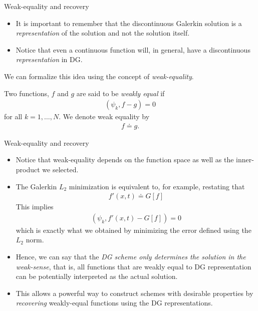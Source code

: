 \documentclass[aspectratio=169]{beamer}
\newcommand{\mypause}{}
\newcommand{\cramplist}{
	\setlength{\itemsep}{0in}
	\setlength{\partopsep}{0in}
	\setlength{\topsep}{0in}}
\begin{document}
\begin{frame}{Weak-equality and recovery}
  \footnotesize
  \begin{itemize}\cramplist
  \item It is important to remember that the discontinuous Galerkin
    solution is a \emph{representation} of the solution and not the
    solution itself.
  \item Notice that even a continuous function will, in general, have
    a discontinuous \emph{representation} in DG.
  \end{itemize}
  \mypause%
  We can formalize this idea using the concept of
  \emph{weak-equality}.

  \begin{definition}
    Two functions, $f$ and $g$ are said to be \emph{weakly equal} if
    \begin{align*}
      (\psi_k,f-g) = 0
    \end{align*}
    for all $k=1,\ldots,N$. We denote weak equality by
    \begin{align*}
      f \doteq g.
    \end{align*}
  \end{definition}  
  
\end{frame}


\begin{frame}{Weak-equality and recovery}
  \footnotesize
  \begin{itemize}
  \item Notice that weak-equality depends on the function space as
    well as the inner-product we selected.
  \item The Galerkin $L_2$ minimization is equivalent to, for example,
    restating that
    \begin{align*}
      f'(x,t) \doteq G[f]
    \end{align*}
    This implies
    \begin{align*}
      \left(\psi_k, f'(x,t)- G[f] \right) = 0
    \end{align*}
    which is exactly what we obtained by minimizing the error defined    
    using the  $L_2$ norm. \mypause
  \item Hence, we can say that the \emph{DG scheme only determines the
      solution in the weak-sense}, that is, all functions that are
    weakly equal to DG representation can be potentially interpreted
    as the actual solution.
  \item This allows a powerful way to construct schemes with desirable
    properties by \emph{recovering} weakly-equal functions using the
    DG representations.
  \end{itemize}

\end{frame}
\end{document}
